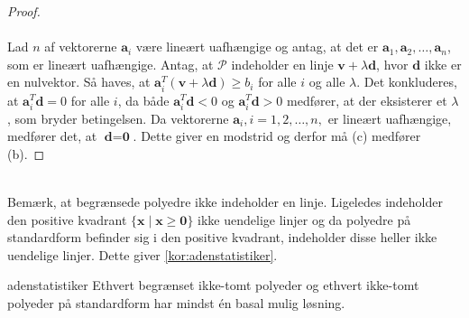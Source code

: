 \begin{proof}
\\\\
%
Lad $n$ af vektorerne $\textbf{a}_i$ være lineært uafhængige og antag, at det er $\textbf{a}_1, \textbf{a}_2, \ldots , \textbf{a}_n$, som er lineært uafhængige.
Antag, at $\mathcal{P}$ indeholder en linje $\textbf{v} + \lambda \textbf{d}$, hvor $\textbf{d}$ ikke er en nulvektor.
Så haves, at $\textbf{a}_i^T (\textbf{v} + \lambda \textbf{d}) \geq b_i$ for alle $i$ og alle $\lambda$.
Det konkluderes, at $\textbf{a}_i^T \textbf{d} = 0$ for alle $i$, da både  $\textbf{a}_i^T \textbf{d} < 0$ og  $\textbf{a}_i^T \textbf{d} > 0$ medfører, at der eksisterer et $\lambda$, som bryder betingelsen.
Da vektorerne $\textbf{a}_i, i = 1, 2, \ldots, n,$ er lineært uafhængige, medfører det, at $\textbf{d}=\textbf{0}$.
Dette giver en modstrid og derfor må (c) medfører (b).
\end{proof}\\
%
Bemærk, at begrænsede polyedre ikke indeholder en linje.
Ligeledes indeholder den positive kvadrant $\{ \textbf{x} \mid \textbf{x} \geq \textbf{0}\}$ ikke uendelige linjer og da polyedre på standardform befinder sig i den positive kvadrant, indeholder disse heller ikke uendelige linjer.
Dette giver \ref{kor:adenstatistiker}.
\begin{kor}{}{adenstatistiker}
Ethvert begrænset ikke-tomt polyeder og ethvert ikke-tomt polyeder på standardform har mindst én basal mulig løsning.
\end{kor}
